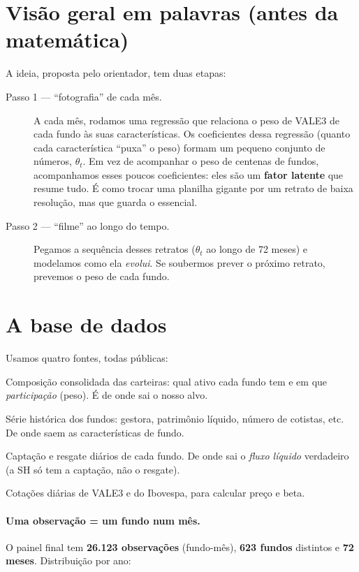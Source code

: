 \documentclass[11pt]{article}
\begin{document}
\section{Visão geral em palavras (antes da matemática)}

A ideia, proposta pelo orientador, tem duas etapas:

\begin{description}
\item[Passo 1 --- ``fotografia'' de cada mês.] A cada mês, rodamos uma regressão que
relaciona o peso de VALE3 de cada fundo às suas características. Os coeficientes dessa
regressão (quanto cada característica ``puxa'' o peso) formam um pequeno conjunto de
números, $\theta_t$. Em vez de acompanhar o peso de centenas de fundos, acompanhamos
esses poucos coeficientes: eles são um \textbf{fator latente} que resume tudo. É como
trocar uma planilha gigante por um retrato de baixa resolução, mas que guarda o
essencial.
\item[Passo 2 --- ``filme'' ao longo do tempo.] Pegamos a sequência desses retratos
($\theta_t$ ao longo de 72 meses) e modelamos como ela \emph{evolui}. Se soubermos
prever o próximo retrato, prevemos o peso de cada fundo.
\end{description}

\section{A base de dados}

Usamos quatro fontes, todas públicas:
\begin{description}[noitemsep]
\item[CONS (CVM) --- mensal.] Composição consolidada das carteiras: qual ativo cada
fundo tem e em que \emph{participação} (peso). É de onde sai o nosso alvo.
\item[SH (CVM) --- diária.] Série histórica dos fundos: gestora, patrimônio líquido,
número de cotistas, etc. De onde saem as características de fundo.
\item[Informe Diário (CVM) --- diário.] Captação e resgate diários de cada fundo. De
onde sai o \emph{fluxo líquido} verdadeiro (a SH só tem a captação, não o resgate).
\item[Yahoo Finance.] Cotações diárias de VALE3 e do Ibovespa, para calcular preço e
beta.
\end{description}

\paragraph{Uma observação = um fundo num mês.} O painel final tem
\textbf{26.123 observações} (fundo-mês), \textbf{623 fundos} distintos e
\textbf{72 meses}. Distribuição por ano:
\end{document}
